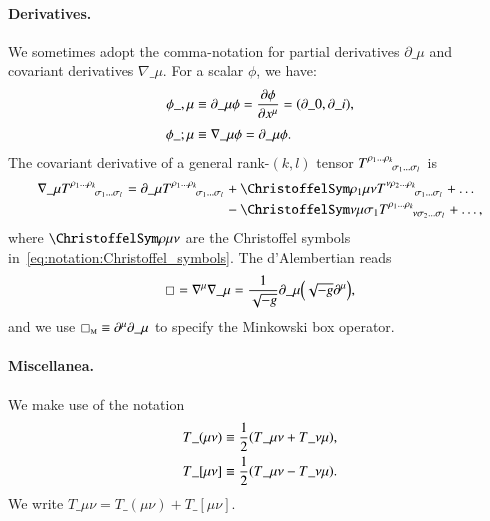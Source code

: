 \paragraph{Derivatives.} 
We sometimes adopt the comma-notation for partial derivatives $\partial\_\mu$ and covariant derivatives $\nabla\_\mu$. For a scalar $\phi$, we have:
\begin{subequations}\label{eq:notation:comma_notation_darivatives}
    \begin{align}
        \phi\_{,\mu} &\equiv \partial\_\mu \phi = \pdv{\phi}{x\^\mu} =\pclosed{\partial\_0, \partial\_i }, \\
        \phi\_{;\mu} &\equiv \nabla\_\mu \phi = \partial\_\mu \phi . 
    \end{align}
\end{subequations}
The covariant derivative of a general rank-$(k,l)$ tensor $T\iud{\rho_1 \dots \rho_k}{\sigma_1 \dots \sigma_l}$ is
\begin{equation}\label{eq:notation:covariant_derivative_rank_kl}
    \begin{split}
        \nabla\_\mu T\iud{\rho_1 \dots \rho_k}{\sigma_1 \dots \sigma_l} = \partial\_\mu T\iud{\rho_1 \dots \rho_k}{\sigma_1 \dots \sigma_l} &+ \Chr{\rho_1}{\mu\nu} T\iud{\nu \rho_2 \dots \rho_k}{\sigma_1 \dots \sigma_l} + \dots \\
        &- \Chr{\nu}{\mu\sigma_1} T\iud{\rho_1 \dots \rho_k}{\nu\sigma_2 \dots \sigma_l} + \dots,
    \end{split}
\end{equation}
where $\Chr{\rho}{\mu\nu}$ are the Christoffel symbols in~\cref{eq:notation:Christoffel_symbols}.
The d'Alembertian reads
\begin{equation}\label{eq:notation:dAlembertian}
    \sq   = \nabla\^\mu \nabla\_\mu  = \frac{1}{\sqrt{-g}} \partial\_\mu \pclosed{ \sqrt{-g} \partial\^\mu},
\end{equation}
and we use $\sq\nped{M} \equiv \partial\^\mu\partial\_\mu$ to specify the Minkowski box operator.


\paragraph{Miscellanea.} %
We make use of the notation
\begin{subequations}\label{eq:notation:sym_and_antisym_tensor_notation}
    \begin{align}
        T\_{(\mu\nu)} &\equiv \frac{1}{2} {\left(  T\_{\mu\nu} + T\_{\nu\mu}   \right)}, \\
        T\_{[\mu\nu]} &\equiv \frac{1}{2} {\left(  T\_{\mu\nu} - T\_{\nu\mu}   \right)}.
    \end{align} 
\end{subequations}
We write $T\_{\mu\nu}= T\_{(\mu\nu)} + T\_{[\mu\nu]}$. %



